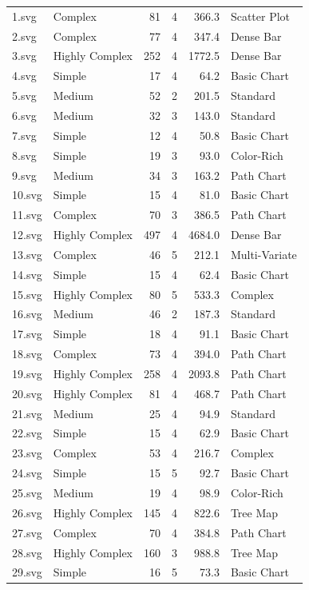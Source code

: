 \documentclass[journal]{IEEEtran}
\begin{document}
\begin{table}[!t]
\begin{tabular}{p{0.6cm}p{1.9cm}r@{\hspace{0.25cm}}r@{\hspace{0.25cm}}r@{\hspace{0.3cm}}p{1.7cm}}
1.svg & Complex & 81 & 4 & 366.3 & Scatter Plot \\
2.svg & Complex & 77 & 4 & 347.4 & Dense Bar \\
3.svg & Highly Complex & 252 & 4 & 1772.5 & Dense Bar \\
4.svg & Simple & 17 & 4 & 64.2 & Basic Chart \\
5.svg & Medium & 52 & 2 & 201.5 & Standard \\
6.svg & Medium & 32 & 3 & 143.0 & Standard \\
7.svg & Simple & 12 & 4 & 50.8 & Basic Chart \\
8.svg & Simple & 19 & 3 & 93.0 & Color-Rich \\
9.svg & Medium & 34 & 3 & 163.2 & Path Chart \\
10.svg & Simple & 15 & 4 & 81.0 & Basic Chart \\
11.svg & Complex & 70 & 3 & 386.5 & Path Chart \\
12.svg & Highly Complex & 497 & 4 & 4684.0 & Dense Bar \\
13.svg & Complex & 46 & 5 & 212.1 & Multi-Variate \\
14.svg & Simple & 15 & 4 & 62.4 & Basic Chart \\
15.svg & Highly Complex & 80 & 5 & 533.3 & Complex \\
16.svg & Medium & 46 & 2 & 187.3 & Standard \\
17.svg & Simple & 18 & 4 & 91.1 & Basic Chart \\
18.svg & Complex & 73 & 4 & 394.0 & Path Chart \\
19.svg & Highly Complex & 258 & 4 & 2093.8 & Path Chart \\
20.svg & Highly Complex & 81 & 4 & 468.7 & Path Chart \\
21.svg & Medium & 25 & 4 & 94.9 & Standard \\
22.svg & Simple & 15 & 4 & 62.9 & Basic Chart \\
23.svg & Complex & 53 & 4 & 216.7 & Complex \\
24.svg & Simple & 15 & 5 & 92.7 & Basic Chart \\
25.svg & Medium & 19 & 4 & 98.9 & Color-Rich \\
26.svg & Highly Complex & 145 & 4 & 822.6 & Tree Map \\
27.svg & Complex & 70 & 4 & 384.8 & Path Chart \\
28.svg & Highly Complex & 160 & 3 & 988.8 & Tree Map \\
29.svg & Simple & 16 & 5 & 73.3 & Basic Chart \\

\end{tabular}
\end{table}
\end{document}
